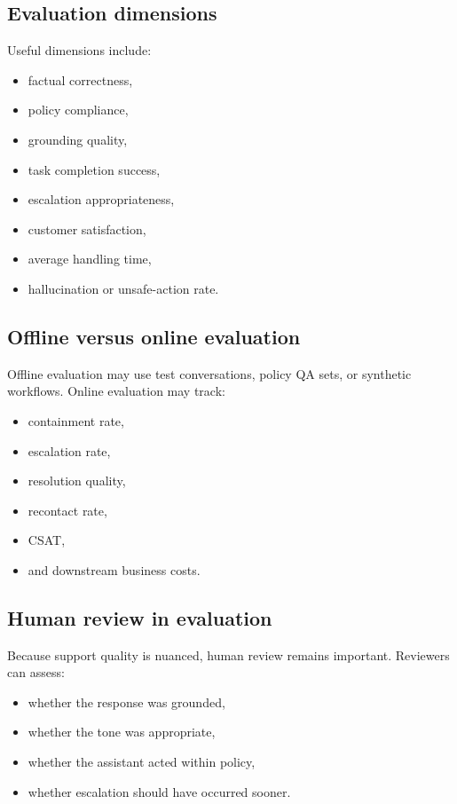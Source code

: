 \subsection{Evaluation dimensions}
Useful dimensions include:
\begin{itemize}
  \item factual correctness,
  \item policy compliance,
  \item grounding quality,
  \item task completion success,
  \item escalation appropriateness,
  \item customer satisfaction,
  \item average handling time,
  \item hallucination or unsafe-action rate.
\end{itemize}

\subsection{Offline versus online evaluation}
Offline evaluation may use test conversations, policy QA sets, or synthetic workflows.
Online evaluation may track:
\begin{itemize}
  \item containment rate,
  \item escalation rate,
  \item resolution quality,
  \item recontact rate,
  \item CSAT,
  \item and downstream business costs.
\end{itemize}

\subsection{Human review in evaluation}
Because support quality is nuanced, human review remains important.
Reviewers can assess:
\begin{itemize}
  \item whether the response was grounded,
  \item whether the tone was appropriate,
  \item whether the assistant acted within policy,
  \item whether escalation should have occurred sooner.
\end{itemize}


